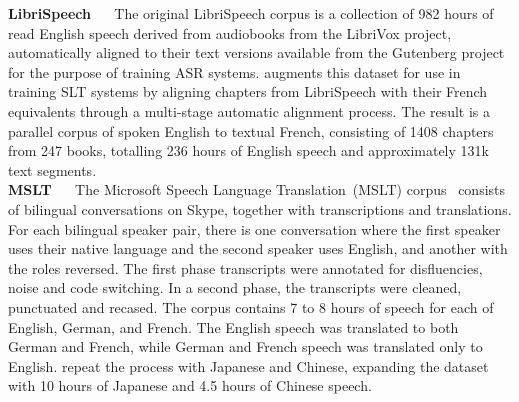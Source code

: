 \documentclass{svjour3}
\newcommand{\element}[1]{\noindent\textbf{#1} ~~}
\begin{document}
        \element{LibriSpeech}
            The original LibriSpeech corpus \citep{panayotov-librispeech-2015} is a collection of 982 hours of read English speech derived from audiobooks from the LibriVox project, automatically aligned to their text versions available from the Gutenberg project for the purpose of training ASR systems.
\citet{kocabiyikoglu-librispeech-slt-2018} augments this dataset for use in training SLT systems by aligning chapters from LibriSpeech with their French equivalents through a multi-stage automatic alignment process.
The result is a parallel corpus of spoken English to textual French,
            consisting of 1408 chapters from 247 books,
            totalling 236 hours of English speech and approximately 131k text segments.\\




        \element{MSLT}
            The Microsoft Speech Language Translation~(MSLT) corpus~\citep{federmann-microsoft-2016} consists of bilingual conversations on Skype,
            together with transcriptions and translations.
            For each bilingual speaker pair, there is one conversation where the first speaker uses their native language and the second speaker uses English,
            and another with the roles reversed.
            The first phase transcripts were annotated for disfluencies, noise and code switching.
            In a second phase, the transcripts were cleaned, punctuated and recased.
            The corpus contains 7 to 8 hours of speech for each of English, German, and French.
            The English speech was translated to both German and French,
            while German and French speech was translated only to English.
\citet{federmann-microsoft-2017} repeat the process with Japanese and Chinese, expanding the dataset with 10 hours of Japanese and 4.5 hours of Chinese speech. \\
\end{document}
